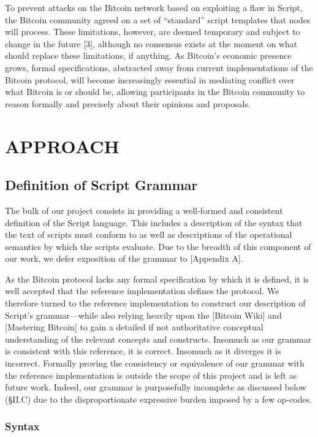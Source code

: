 \documentclass[letterpaper, 10 pt, conference]{ieeeconf}
\begin{document}
To prevent attacks on the Bitcoin network based on exploiting a flaw in Script, the Bitcoin community agreed on a set of ``standard'' script templates that nodes will process. These limitations, however, are deemed temporary and subject to change in the future [3], although no consensus exists at the moment on what should replace these limitations, if anything. As Bitcoin's economic presence grows, formal specifications, abstracted away from current implementations of the Bitcoin protocol, will become increasingly essential in mediating conflict over what Bitcoin is or should be, allowing participants in the Bitcoin community to reason formally and precisely about their opinions and proposals.

\section{APPROACH}

\subsection{Definition of Script Grammar}
The bulk of our project consists in providing a well-formed and consistent definition of the Script language. This includes a description of the syntax that the text of scripts must conform to as well as descriptions of the operational semantics by which the scripts evaluate. Due to the breadth of this component of our work, we defer exposition of the grammar to [Appendix A].

As the Bitcoin protocol lacks any formal specification by which it is defined, it is well accepted that the reference implementation defines the protocol. We therefore turned to the reference implementation to construct our description of Script's grammar---while also relying heavily upon the [Bitcoin Wiki] and [Mastering Bitcoin] to gain a detailed if not authoritative conceptual understanding of the relevant concepts and constructs. Insomuch as our grammar is consistent with this reference, it is correct. Insomuch as it diverges it is incorrect. Formally proving the consistency or equivalence of our grammar with the reference implementation is outside the scope of this project and is left as future work. Indeed, our grammar is purposefully incomplete as discussed below (\S II.C) due to the disproportionate expressive burden imposed by a few op-codes.
\subsubsection{Syntax}
\end{document}
